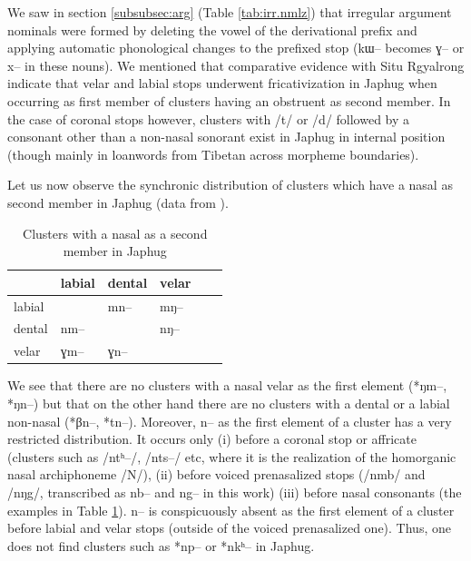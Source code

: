 \documentclass[oldfontcommands,oneside,a4paper,11pt]{article}
\newcommand{\ipa}[1]{{\phon \mbox{#1}}} %
\newcommand{\grise}[1]{\cellcolor{lightgray}\textbf{#1}}
\begin{document}
We saw in section \ref{subsubsec:arg} (Table \ref{tab:irr.nmlz}) that irregular argument nominals were formed by deleting the vowel of the derivational prefix and applying automatic phonological changes to the prefixed stop (\ipa{kɯ}-- becomes \ipa{ɣ}-- or \ipa{x}-- in these nouns). We mentioned that comparative evidence with Situ Rgyalrong indicate that velar and labial stops underwent fricativization in Japhug when occurring as first member of  clusters having an obstruent as   second member. In the case of coronal stops however, clusters with /t/ or /d/ followed by a consonant other than a non-nasal sonorant exist in Japhug in internal position (though mainly in loanwords from Tibetan across morpheme boundaries).

Let us now observe the synchronic distribution of clusters which have a nasal as second member in Japhug (data from \citealt{jacques04these}).

\begin{table}[H]
\caption{Clusters with a nasal as a second member in Japhug}  \label{tab:nasal} \centering
\begin{tabular}{llllll}
\toprule
  &  	labial  &  	dental  &  	velar  \\  
  \midrule
labial  &  	\grise{}  &  	\ipa{mn--}  &  	\ipa{mŋ--}  \\  
dental  &  	\ipa{nm--}  &  	\grise{}  &  	\ipa{nŋ--}  \\  
velar  &  	\ipa{ɣm--}  &  	\ipa{ɣn--}  &  	\grise{}  \\  
\bottomrule
\end{tabular}
\end{table}

We see that there are no clusters with a nasal velar as the first element (*\ipa{ŋm}--, *\ipa{ŋn}--) but that on the other hand there are no clusters with a dental or a labial non-nasal (*\ipa{βn}--, *\ipa{tn}--). Moreover, \ipa{n}-- as the first element of a cluster has a very restricted distribution. It occurs only (i) before a coronal stop or affricate (clusters such as /\ipa{ntʰ--}/, /\ipa{nts--}/ etc, where it is the realization of the homorganic nasal archiphoneme /N/), (ii) before voiced prenasalized stops (/\ipa{nmb}/ and /\ipa{nŋg}/, transcribed as \ipa{nb--} and \ipa{ng--} in this work) (iii) before nasal consonants (the examples in Table \ref{tab:nasal}). \ipa{n}-- is conspicuously absent as the first element of a cluster before labial  and velar stops (outside of the voiced prenasalized one). Thus, one does not find clusters such as *\ipa{np--} or *\ipa{nkʰ--} in Japhug. 
\end{document}
